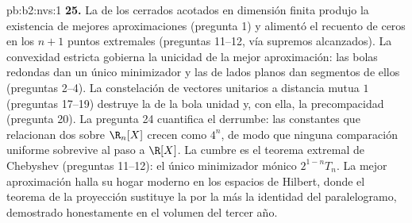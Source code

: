 \begin{solution}{pb:b2:nvs:1}
\textbf{25.} La  de los cerrados acotados en dimensión
finita produjo la existencia de mejores aproximaciones (pregunta
1) y alimentó el recuento de ceros en los $n + 1$ puntos
extremales (preguntas 11--12, vía supremos alcanzados). La
convexidad estricta gobierna la unicidad de la mejor aproximación:
las bolas redondas dan un único minimizador y las de lados planos
dan segmentos de ellos (preguntas 2--4). La constelación de
vectores unitarios a distancia mutua $1$ (preguntas 17--19)
destruye la  de la bola unidad y, con ella, la
precompacidad (pregunta 20). La pregunta 24 cuantifica el
derrumbe: las constantes que relacionan dos  sobre
$\R_n[X]$ crecen como $4^n$, de modo que ninguna comparación
uniforme sobrevive al paso a $\R[X]$. La cumbre es el teorema
extremal de Chebyshev (preguntas 11--12): el único minimizador
mónico $2^{1-n}T_n$. La mejor aproximación halla su hogar moderno
en los espacios de Hilbert, donde el teorema de la proyección
sustituye la  por la  más la identidad del
paralelogramo, demostrado honestamente en el volumen del tercer
año.
\end{solution}
